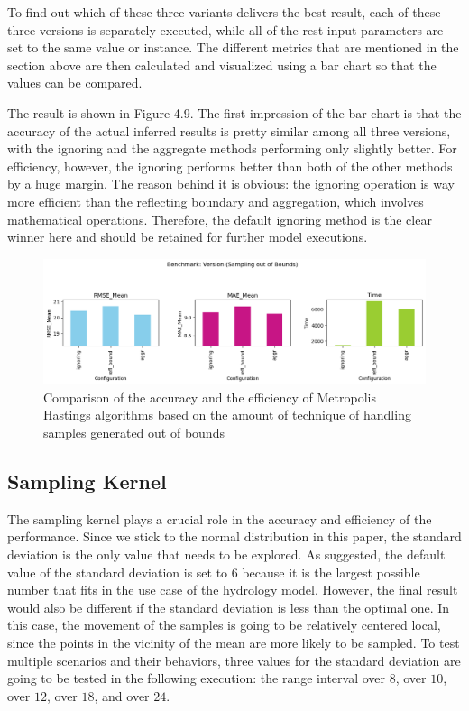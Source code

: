 To find out which of these three variants delivers the best result, each of these three versions is separately executed, while all of the rest input parameters are set to the same value or instance. The different metrics that are mentioned in the section above are then calculated and visualized using a bar chart so that the values can be compared. 

The result is shown in Figure 4.9. The first impression of the bar chart is that the accuracy of the actual inferred results is pretty similar among all three versions, with the ignoring and the aggregate methods performing only slightly better. For efficiency, however, the ignoring performs better than both of the other methods by a huge margin. The reason behind it is obvious: the ignoring operation is way more efficient than the reflecting boundary and aggregation, which involves mathematical operations. Therefore, the default ignoring method is the clear winner here and should be retained for further model executions.


\begin{figure}[H]
    \centering
    \includegraphics[width=1\textwidth]{figures/basic_mh/benchmark/sampling_otb.png}
    \captionsetup{width=.8\textwidth}
    \caption{Comparison of the accuracy and the efficiency of Metropolis Hastings algorithms based on the amount of technique of handling samples generated out of bounds}
    \label{fig:enter-label}
\end{figure}



\subsection{Sampling Kernel}
The sampling kernel plays a crucial role in the accuracy and efficiency of the performance. Since we stick to the normal distribution in this paper, the standard deviation is the only value that needs to be explored. As suggested, the default value of the standard deviation is set to $6$ because it is the largest possible number that fits in the use case of the hydrology model. However, the final result would also be different if the standard deviation is less than the optimal one. In this case, the movement of the samples is going to be relatively centered local, since the points in the vicinity of the mean are more likely to be sampled. To test multiple scenarios and their behaviors, three values for the standard deviation are going to be tested in the following execution: the range interval over $8$, over $10$, over $12$, over $18$, and over $24$.

